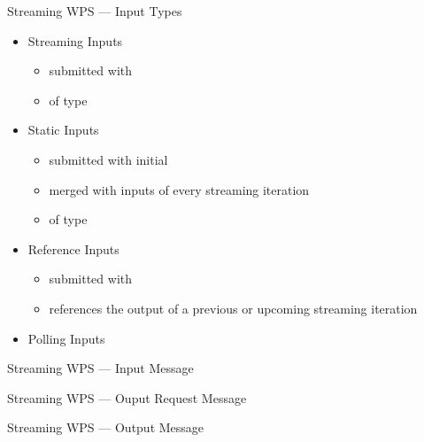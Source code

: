 \documentclass[xcolor=svgnames,professionalfonts,11pt,aspectratio=43,handout]{beamer}
\begin{document}
\begin{frame}{Streaming WPS --- Input Types}
  \begin{itemize}
    \item Streaming Inputs
    \pause
    \begin{itemize}
      \item submitted with 
      \item of type 
    \end{itemize}
    \pause
    \item Static Inputs
    \pause
    \begin{itemize}
      \item submitted with initial 
      \item merged with inputs of every streaming iteration
      \item of type 
    \end{itemize}
    \pause
    \item Reference Inputs
    \pause
    \begin{itemize}
      \item submitted with 
      \item references the output of a previous or upcoming streaming iteration
    \end{itemize}
    \pause
    \item Polling Inputs
  \end{itemize}
\end{frame}

\begin{frame}[c,fragile]{Streaming WPS --- Input Message}
    \begin{center}
      
    \end{center}
\end{frame}

\begin{frame}[c,fragile]{Streaming WPS --- Ouput Request Message}
    \begin{center}
      
    \end{center}
\end{frame}

\begin{frame}[c,fragile]{Streaming WPS --- Output Message}
    \begin{center}
      
    \end{center}
\end{frame}
\end{document}
